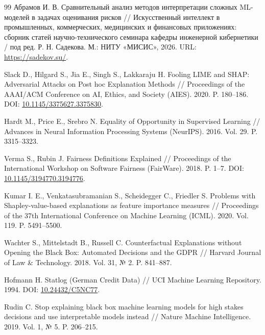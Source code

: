 \documentclass{misisarticle}
\begin{document}
\begin{thebibliography}{99}
Абрамов И. В. Сравнительный анализ методов интерпретации сложных ML-моделей в задачах оценивания рисков // Искусственный интеллект в промышленных, коммерческих, медицинских и финансовых приложениях: сборник статей научно-технического семинара кафедры инженерной кибернетики / под ред. Р. Н. Садекова. М.: НИТУ «МИСИС», 2026. URL: \url{https://sadekov.su/}.

Slack D., Hilgard S., Jia E., Singh S., Lakkaraju H. Fooling LIME and SHAP: Adversarial Attacks on Post hoc Explanation Methods // Proceedings of the AAAI/ACM Conference on AI, Ethics, and Society (AIES). 2020. P. 180--186. DOI: \url{10.1145/3375627.3375830}.

Hardt M., Price E., Srebro N. Equality of Opportunity in Supervised Learning // Advances in Neural Information Processing Systems (NeurIPS). 2016. Vol. 29. P. 3315--3323.

Verma S., Rubin J. Fairness Definitions Explained // Proceedings of the International Workshop on Software Fairness (FairWare). 2018. P. 1--7. DOI: \url{10.1145/3194770.3194776}.

Kumar I. E., Venkatasubramanian S., Scheidegger C., Friedler S. Problems with Shapley-value-based explanations as feature importance measures // Proceedings of the 37th International Conference on Machine Learning (ICML). 2020. Vol. 119. P. 5491--5500.

Wachter S., Mittelstadt B., Russell C. Counterfactual Explanations without Opening the Black Box: Automated Decisions and the GDPR // Harvard Journal of Law \& Technology. 2018. Vol. 31, № 2. P. 841--887.

Hofmann H. Statlog (German Credit Data) // UCI Machine Learning Repository. 1994. DOI: \url{10.24432/C5NC77}.

Rudin C. Stop explaining black box machine learning models for high stakes decisions and use interpretable models instead // Nature Machine Intelligence. 2019. Vol. 1, № 5. P. 206--215.

\end{thebibliography}
\end{document}
